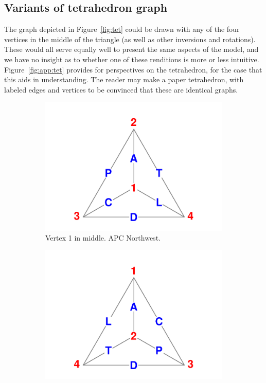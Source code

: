 \documentclass[11pt,oneside,a4paper]{article} %
\newcommand\vt[1]{\textcolor{rd}{#1}}
\begin{document}
\begin{appendices}
\section{Variants of tetrahedron graph}
The graph depicted in Figure~\ref{fig:tet} could be drawn with any of the
four vertices in the middle of the triangle (as well as other inversions
and rotations).
These would all serve equally well to present the same aspects of the model, and
we have no insight as to whether one of these renditions is more or less
intuitive. Figure~\ref{fig:app:tet} provides for perspectives on the
tetrahedron, for the case that this aids in understanding. The reader may make a
paper tetrahedron, with labeled edges and vertices to be convinced that
these are identical graphs.
\begin{figure}
        \centering
        \caption{Some variants of the graph of the APCTDL tetrahedron.} 
         \label{fig:app:tet}
        \begin{subfigure}[b]{0.475\textwidth}
            \centering
            \includegraphics[width=\textwidth]{Figures/Tetra1.pdf}
           \caption{\small Vertex \vt{1} in middle. APC Northwest.}
            \label{fig:tet1}
        \end{subfigure}
        \hfill
        \begin{subfigure}[b]{0.475\textwidth}  
            \centering 
            \includegraphics[width=\textwidth]{Figures/Tetra2.pdf}

\end{subfigure}
\end{figure}
\end{appendices}
\end{document}
